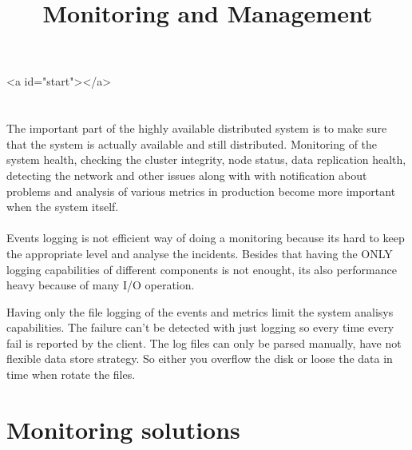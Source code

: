 



\title{Monitoring and Management}
\authors
\maketitle

\begin{rawhtml}
<a id="start"></a>
\end{rawhtml}

\section*{}
\paragraph{}
The important part of the highly available distributed system is to make sure that the system is actually available and still distributed.
Monitoring of the system health, checking the cluster integrity, node status, data replication health, detecting the network and other issues
along with with notification about problems and analysis of various metrics in production become more important when the system itself.

\paragraph{}
Events logging is not efficient way of doing a monitoring because its hard to keep the appropriate level and analyse the incidents.
Besides that having the ONLY logging capabilities of different components is not enought, its also performance heavy because of many I/O operation.

Having only the file logging of the events and metrics limit the system analisys capabilities.
The failure can't be detected with just logging so every time every fail is reported by the client.
The log files can only be parsed manually, have not flexible data store strategy. So either you overflow the disk or loose the data in time when rotate the files.

\paragraph{}

\section*{Monitoring solutions}

